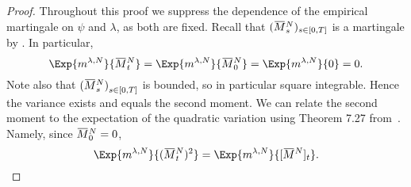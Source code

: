 \begin{proof}
  Throughout this proof we suppress the dependence of the empirical martingale on \( \psi \) and \( \lambda \), as both are fixed.
  Recall that \((\ol{M}_s^N)_{s\in[0,T]}\) is a martingale by .
  In particular,
  \begin{equation}
    \Exp{\lawmu^{\lambda,N}}{\ol{M}_t^N} = \Exp{\lawmu^{\lambda,N}}{\ol{M}_0^N}
    = \Exp{\lawmu^{\lambda,N}}{0} = 0.    %
  \end{equation}
  Note also that \({(\ol{M}_s^N)}_{s\in[0,T]}\) is bounded, so in particular square integrable.
  Hence the variance exists and equals the second moment.
  We can relate the second moment to the expectation of the quadratic variation using Theorem 7.27 from~\cite[201]{klebanerIntroductionStochasticCalculus2012}.
  Namely, since \(\ol{M}_0^N = 0\),
  \begin{equation}
    \Exp{\lawmu^{\lambda,N}}{(\ol{M}_t^N)^2} = \Exp{\lawmu^{\lambda,N}}{\sbr{\ol{M}^N}_t}.
  \end{equation}


\end{proof}
